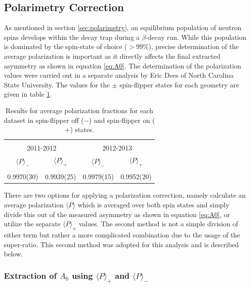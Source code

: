 \subsection{Polarimetry Correction}

As mentioned in section \ref{sec:polarimetry}, an equilibrium population of neutron
spins develops within the decay trap during a $\beta$-decay run. While this population is
dominated by the spin-state of choice ($>99\%$), precise determination of the average
polarization is important as it directly affects the final extracted asymmetry as shown in
equation \ref{eq:A0}. The determination of the polarization values were carried
out in a separate analysis by Eric Dees of North Carolina State University.
The values for the $\pm$ spin-flipper states for
each geometry are given in table \ref{tab:pol}.

\setlength{\tabcolsep}{12pt}
\begin{table}[h]
  \caption{Results for average polarization fractions for each dataset in spin-flipper off ($-$)
    and spin-flipper on ($+$) states.} 
  \centering
  \begin{tabular}{c c c c}
    \hline \hline \\ [-1.75ex]
    \multicolumn{2}{c}{2011-2012}&\multicolumn{2}{c}{2012-2013} \\ [0.5ex]
    $\langle P \rangle_-$ & $\langle P \rangle_+$ & $\langle P \rangle_-$ & $\langle P\rangle_+$ \\ [0.25ex]
    \hline \\ [-1.75ex]
    0.9970(30) & 0.9939(25) & 0.9979(15) & 0.9952(20) \\ [0.25ex]
    \hline
  \end{tabular}
  \label{tab:pol}
\end{table}

There are two options for applying a polarization correction, namely
calculate an average polarization $\langle P \rangle$
which is averaged over both spin states and simply
divide this out of the measured asymmetry as shown in equation \ref{eq:A0}, or utilize the
separate $\langle P\rangle_\pm$ values. The second method is not a simple division of
either term but rather a more complicated combination due to the usage of the super-ratio.
This second method was adopted for this analysis and is described below.

\subsubsection{Extraction of $A_0$ using $\langle P \rangle_+$ and $\langle P \rangle_-$}
\label{ssec:polSep}

